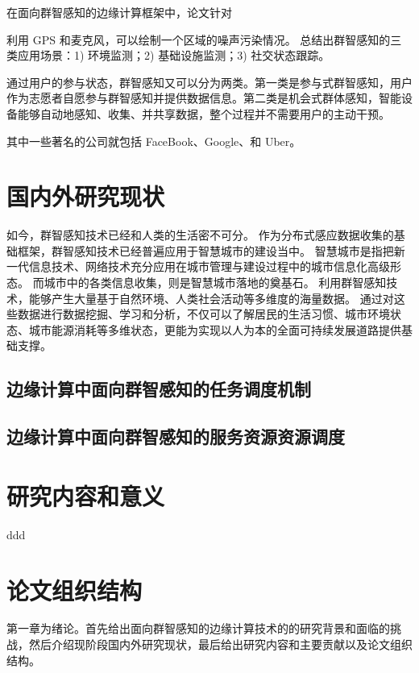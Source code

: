 在面向群智感知的边缘计算框架中，论文针对

利用 GPS 和麦克风，可以绘制一个区域的噪声污染情况。
\cite{DBLP:journals/cm/GantiYL11} 总结出群智感知的三类应用场景：1) 环境监测；2) 基础设施监测；3) 社交状态跟踪。

通过用户的参与状态，群智感知又可以分为两类。第一类是参与式群智感知，用户作为志愿者自愿参与群智感知并提供数据信息。第二类是机会式群体感知，智能设备能够自动地感知、收集、并共享数据，整个过程并不需要用户的主动干预。


其中一些著名的公司就包括 FaceBook、Google、和 Uber。


\section{国内外研究现状}

如今，群智感知技术已经和人类的生活密不可分。
作为分布式感应数据收集的基础框架，群智感知技术已经普遍应用于智慧城市的建设当中。
智慧城市是指把新一代信息技术、网络技术充分应用在城市管理与建设过程中的城市信息化高级形态。
而城市中的各类信息收集，则是智慧城市落地的奠基石。
利用群智感知技术，能够产生大量基于自然环境、人类社会活动等多维度的海量数据。
通过对这些数据进行数据挖掘、学习和分析，不仅可以了解居民的生活习惯、城市环境状态、城市能源消耗等多维状态，更能为实现以人为本的全面可持续发展道路提供基础支撑。


\subsection{边缘计算中面向群智感知的任务调度机制}

\subsection{边缘计算中面向群智感知的服务资源资源调度}

\section{研究内容和意义}
ddd

\section{论文组织结构}
第一章为绪论。首先给出面向群智感知的边缘计算技术的的研究背景和面临的挑战，然后介绍现阶段国内外研究现状，最后给出研究内容和主要贡献以及论文组织结构。

